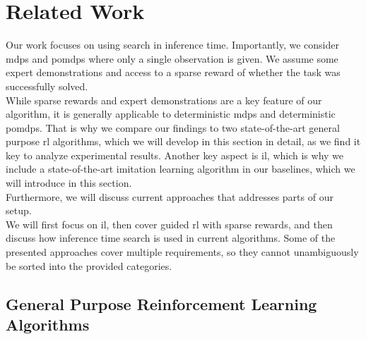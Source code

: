 
\chapter{Related Work}
\label{chapter:RelWork}
Our work focuses on using search in inference time. Importantly, we consider \ac{mdp}s and \ac{pomdp}s where only a single observation is given. 
We assume some expert demonstrations and access to a sparse
reward of whether the task was successfully solved. \\

While sparse rewards and expert demonstrations are a key feature of our algorithm, it is generally applicable to deterministic \ac{mdp}s and deterministic \ac{pomdp}s. That is why we compare our 
findings to two state-of-the-art general purpose \ac{rl} algorithms, which we will develop in this section in detail, as we find it key to analyze experimental results. 
Another key aspect is \ac{il}, which is why we include a state-of-the-art imitation learning algorithm in our baselines, which we will introduce in this section. \\

Furthermore, we will discuss current approaches that addresses parts of our setup. \\
We will first focus on \ac{il}, then cover guided \ac{rl} with sparse rewards, and then
discuss how inference time search is used in current algorithms. Some of the presented approaches cover multiple requirements, so they cannot unambiguously be sorted into the provided categories.

\section{General Purpose Reinforcement Learning Algorithms}
